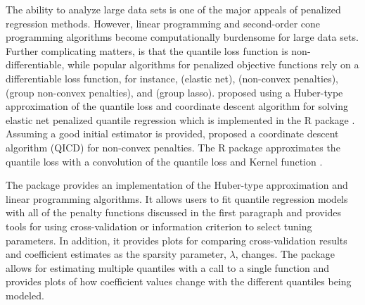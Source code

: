 The ability to analyze large data sets is one of the major appeals of penalized regression methods. However, linear programming and second-order cone programming algorithms become computationally burdensome for large data sets. Further complicating matters, is that the quantile loss function is non-differentiable, while popular algorithms for penalized objective functions rely on a differentiable loss function, for instance, \cite{friedman2009glmnet} (elastic net), \cite{scadAlg} (non-convex penalties), \cite{brehenyglasso} (group non-convex penalties), and \cite{Yang2015} (group lasso). \cite{huber_cd} proposed using a Huber-type approximation of the quantile loss and coordinate descent algorithm for solving elastic net penalized quantile regression which is implemented in the R package . Assuming a good initial estimator is provided, \cite{qr_cd} proposed a coordinate descent algorithm (QICD) for non-convex penalties. The R package  approximates the quantile loss with a convolution of the quantile loss and Kernel function \citep{lowdConv,highdConv}.

The package  provides an implementation of the Huber-type approximation and linear programming algorithms. It allows users to fit quantile regression models with all of the penalty functions discussed in the first paragraph and provides tools for using cross-validation or information criterion to select tuning parameters. In addition, it provides plots for comparing cross-validation results and coefficient estimates as the sparsity parameter, \(\lambda\), changes. The package allows for estimating multiple quantiles with a call to a single function and provides plots of how coefficient values change with the different quantiles being modeled.

